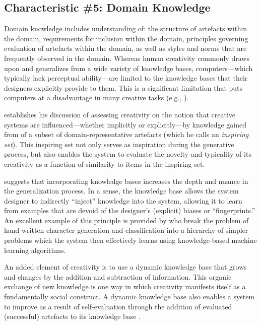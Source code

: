 \documentclass[phd,electronic,oneside,twosidetoc,letterpaper,chaptercenter,parttop,lol,lof,lot]{byumsphd}
\begin{document}
\subsection{Characteristic \#5: Domain Knowledge}

Domain knowledge includes understanding of: the structure of artefacts within the domain, requirements for inclusion within the domain, principles governing evaluation of artefacts within the domain, as well as styles and norms that are frequently observed in the domain. Whereas human creativity commonly draws upon and generalizes from a wide variety of knowledge bases, computers---which typically lack perceptual ability---are limited to the knowledge bases that their designers explicitly provide to them. This is a significant limitation that puts computers at a disadvantage in many creative tasks (e.g., \citep{bodily2018ComparativeAnalysis}).

\cite{Ritchie2007} establishes his discussion of assessing creativity on the notion that creative systems are influenced---whether implicitly or explicitly---by knowledge gained from of a subset of domain-representative artefacts (which he calls an \textit{inspiring set}). This inspiring set not only serves as inspiration during the generative process, but also enables the system to evaluate the novelty and typicality of its creativity as a function of similarity to items in the inspiring set.

\cite{Ventura2016} suggests that incorporating knowledge bases increases the depth and nuance in the generalization process. In a sense, the knowledge base allows the system designer to indirectly ``inject'' knowledge into the system, allowing it to learn from examples that are devoid of the designer's (explicit) biases or ``fingerprints.'' An excellent example of this principle is provided by \cite{Lake2015} who break the problem of hand-written character generation and classification into a hierarchy of simpler problems which the system then effectively learns using knowledge-based machine learning algorithms.

An added element of creativity is to use a dynamic knowledge base that grows and changes by the addition and subtraction of information. This organic exchange of new knowledge is one way in which creativity manifests itself as a fundamentally social construct. A dynamic knowledge base also enables a system to improve as a result of self-evaluation through the addition of evaluated (successful) artefacts to its knowledge base \citep{perez2004three}.
\end{document}
